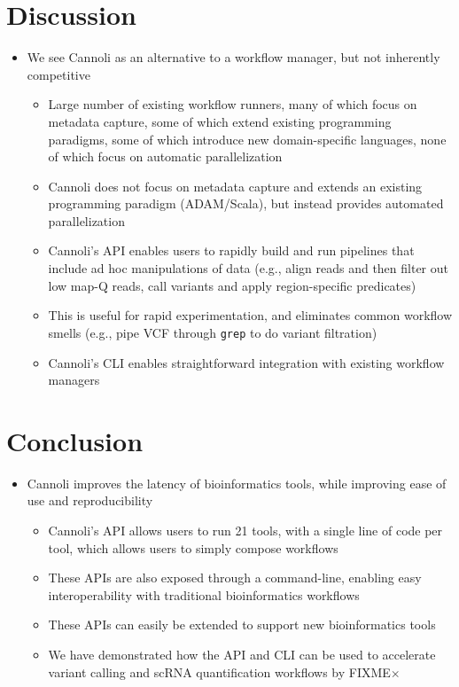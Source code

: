 \documentclass{bioinfo}
\begin{document}
\section{Discussion}

\begin{itemize}
\item We see Cannoli as an alternative to a workflow manager, but not inherently
  competitive
  \begin{itemize}
  \item Large number of existing workflow runners, many of which focus on metadata
    capture, some of which extend existing programming paradigms, some of which
    introduce new domain-specific languages, none of which focus on automatic
    parallelization
  \item Cannoli does not focus on metadata capture and extends an existing
    programming paradigm (ADAM/Scala), but instead provides automated parallelization
  \item Cannoli's API enables users to rapidly build and run pipelines that include
    ad hoc manipulations of data (e.g., align reads and then filter out low map-Q
    reads, call variants and apply region-specific predicates)
  \item This is useful for rapid experimentation, and eliminates common workflow
    smells (e.g., pipe VCF through \texttt{grep} to do variant filtration)
  \item Cannoli's CLI enables straightforward integration with existing workflow
    managers
  \end{itemize}
\end{itemize}

\section{Conclusion}

\begin{itemize}
\item Cannoli improves the latency of bioinformatics tools, while improving
  ease of use and reproducibility
  \begin{itemize}
  \item Cannoli's API allows users to run 21 tools, with a single line of
    code per tool, which allows users to simply compose workflows
  \item These APIs are also exposed through a command-line, enabling easy
    interoperability with traditional bioinformatics workflows
  \item These APIs can easily be extended to support new bioinformatics tools
  \item We have demonstrated how the API and CLI can be used to accelerate
    variant calling and scRNA quantification workflows by FIXME$\times$
  \end{itemize}
\end{itemize}
\end{document}
